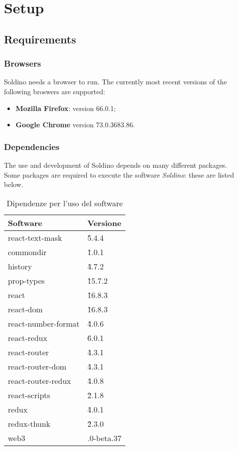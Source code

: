 \section{Setup} 
\subsection{Requirements}
\subsubsection{Browsers}
Soldino needs a browser to run. The currently most recent versions of the following broswers are supported:
\begin{itemize}
	\item \textbf{Mozilla Firefox}: version 66.0.1;
	\item \textbf{Google Chrome} version 73.0.3683.86.
\end{itemize}

\subsubsection{Dependencies}
The use and development of Soldino depends on many different packages.\\
Some packages are required to execute the software \textit{Soldino}: these are listed below.
\renewcommand{\arraystretch}{1.5}
\begin{longtable}{ 
		>{\centering}p{} 
		>{\centering}p{}
	}
	\caption{Dipendenze per l'uso del software}\\
	\rowcolorhead
	\textbf{\color{white}Software} & 
	\textbf{\color{white}Versione}
	\tabularnewline  
	\endhead	
	


	react-text-mask & \^5.4.4
	\tabularnewline
	commondir &\^1.0.1
	\tabularnewline
	history &\^4.7.2
	\tabularnewline
	prop-types &\^15.7.2\tabularnewline
	react &\^16.8.3\tabularnewline
	react-dom &\^16.8.3\tabularnewline
	react-number-format &\^4.0.6\tabularnewline
	react-redux &\^6.0.1\tabularnewline
	react-router &\^4.3.1\tabularnewline
	react-router-dom &\^4.3.1\tabularnewline
	react-router-redux &\^4.0.8\tabularnewline
	react-scripts &\^2.1.8\tabularnewline
	redux &\^4.0.1\tabularnewline
	redux-thunk &\^2.3.0\tabularnewline
	web3 & 1.0.0-beta.37\tabularnewline
	
\end{longtable}

